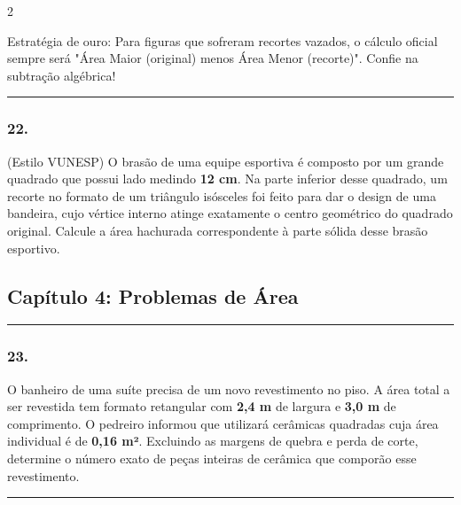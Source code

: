 \documentclass[twoside, 10pt, a4paper]{article}
\newlength{\espacoPosTitulo}\setlength{\espacoPosTitulo}{0.3cm}
\newlength{\espacoPreQuestao}\setlength{\espacoPreQuestao}{0.1cm}
\newlength{\espacoQuestao}\setlength{\espacoQuestao}{0.2cm}
\begin{document}
\begin{multicols*}{2}
\begin{boxdica}
Estratégia de ouro: Para figuras que sofreram recortes vazados, o cálculo oficial sempre será "Área Maior (original) menos Área Menor (recorte)". Confie na subtração algébrica!
\end{boxdica}

\noindent\textcolor{CorLinha}{\rule{\linewidth}{0.5pt}} 
\par\vspace{\espacoPreQuestao}
\subsubsection*{22.} (Estilo VUNESP) O brasão de uma equipe esportiva é composto por um grande quadrado que possui lado medindo \textbf{12 cm}. Na parte inferior desse quadrado, um recorte no formato de um triângulo isósceles foi feito para dar o design de uma bandeira, cujo vértice interno atinge exatamente o centro geométrico do quadrado original. Calcule a área hachurada correspondente à parte sólida desse brasão esportivo.
\par\vspace{\espacoQuestao}

\subsection*{Capítulo 4: Problemas de Área}
\vspace{-0.2cm}\noindent\rule{\linewidth}{1.5pt} 
\par\vspace{\espacoPosTitulo}
\subsubsection*{23.} O banheiro de uma suíte precisa de um novo revestimento no piso. A área total a ser revestida tem formato retangular com \textbf{2,4 m} de largura e \textbf{3,0 m} de comprimento. O pedreiro informou que utilizará cerâmicas quadradas cuja área individual é de \textbf{0,16 m²}. Excluindo as margens de quebra e perda de corte, determine o número exato de peças inteiras de cerâmica que comporão esse revestimento.
\par\vspace{\espacoQuestao}

\noindent\textcolor{CorLinha}{\rule{\linewidth}{0.5pt}} 
\par\vspace{\espacoPreQuestao}

\end{multicols*}
\end{document}
